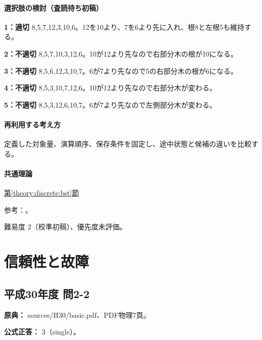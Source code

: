 \paragraph{選択肢の検討（査読待ち初稿）}\mbox{}\par

\noindent\textbf{1：適切} 8,5,7,12,3,10,6。12を10より、7を6より先に入れ、根8と左根5も維持する。\par

\noindent\textbf{2：不適切} 8,5,7,10,3,12,6。10が12より先なので右部分木の根が10になる。\par

\noindent\textbf{3：不適切} 8,5,6,12,3,10,7。6が7より先なので5の右部分木の根が6になる。\par

\noindent\textbf{4：不適切} 8,5,3,10,7,12,6。10が12より先なので右部分木が変わる。\par

\noindent\textbf{5：不適切} 8,5,3,12,6,10,7。6が7より先なので左側部分木が変わる。\par

\paragraph{再利用する考え方} 定義した対象量、演算順序、保存条件を固定し、途中状態と候補の違いを比較する。

\paragraph{共通理論} \hyperref[theory:discrete:bst]{第\ref*{theory:discrete:bst}節}

\par 参考：\cite{princeton_bst}。

\par 難易度 2（校準初稿）、優先度未評価。

\section{信頼性と故障}

\subsection{平成30年度 問2-2}
\label{q:h30-reg-basic-2-2}

\noindent\textbf{原典：} sources/H30/basic.pdf、PDF物理7頁。

\textbf{公式正答：} 3（single）。

